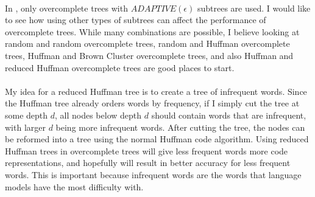 \paragraph{}
In \cite{MnihHinton2009}, only overcomplete trees with $ADAPTIVE(\epsilon)$ subtrees are used. I would like to see how using other types of subtrees can affect the performance of overcomplete trees. While many combinations are possible, I believe looking at random and random overcomplete trees, random and Huffman overcomplete trees, Huffman and Brown Cluster overcomplete trees, and also Huffman and reduced Huffman overcomplete trees are good places to start.
\paragraph{}
My idea for a reduced Huffman tree is to create a tree of infrequent words. Since the Huffman tree already orders words by frequency, if I simply cut the tree at some depth $d$, all nodes below depth $d$ should contain words that are infrequent, with larger $d$ being more infrequent words. After cutting the tree, the nodes can be reformed into a tree using the normal Huffman code algorithm. Using reduced Huffman trees in overcomplete trees will give less frequent words more code representations, and hopefully will result in better accuracy for less frequent words. This is important because infrequent words are the words that language models have the most difficulty with.

